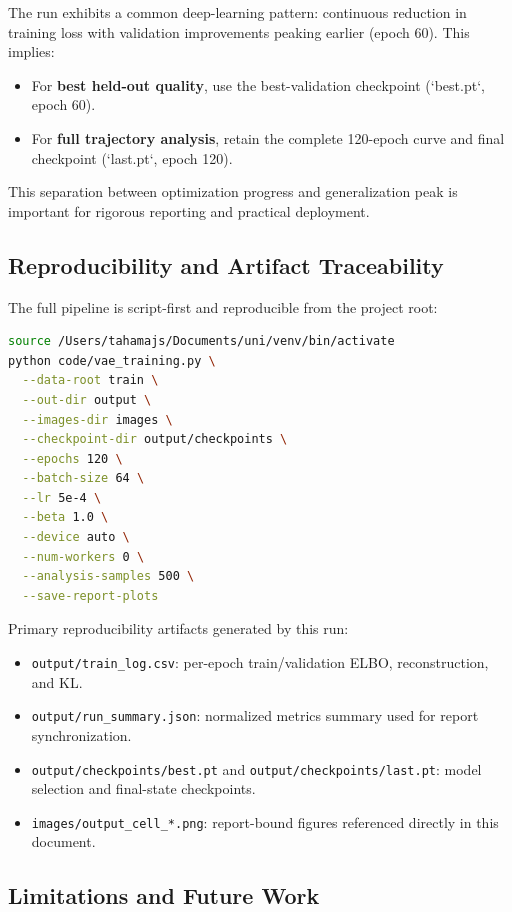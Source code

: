 \documentclass[conference]{IEEEtran}
\begin{document}
The run exhibits a common deep-learning pattern: continuous reduction in training loss with validation improvements peaking earlier (epoch 60). This implies:
\begin{itemize}
    \item For \textbf{best held-out quality}, use the best-validation checkpoint (`best.pt`, epoch 60).
    \item For \textbf{full trajectory analysis}, retain the complete 120-epoch curve and final checkpoint (`last.pt`, epoch 120).
\end{itemize}

This separation between optimization progress and generalization peak is important for rigorous reporting and practical deployment.

\subsection{Reproducibility and Artifact Traceability}

The full pipeline is script-first and reproducible from the project root:
\begin{lstlisting}[language=bash]
source /Users/tahamajs/Documents/uni/venv/bin/activate
python code/vae_training.py \
  --data-root train \
  --out-dir output \
  --images-dir images \
  --checkpoint-dir output/checkpoints \
  --epochs 120 \
  --batch-size 64 \
  --lr 5e-4 \
  --beta 1.0 \
  --device auto \
  --num-workers 0 \
  --analysis-samples 500 \
  --save-report-plots
\end{lstlisting}

Primary reproducibility artifacts generated by this run:
\begin{itemize}
    \item \texttt{output/train\_log.csv}: per-epoch train/validation ELBO, reconstruction, and KL.
    \item \texttt{output/run\_summary.json}: normalized metrics summary used for report synchronization.
    \item \texttt{output/checkpoints/best.pt} and \texttt{output/checkpoints/last.pt}: model selection and final-state checkpoints.
    \item \texttt{images/output\_cell\_*.png}: report-bound figures referenced directly in this document.
\end{itemize}

\subsection{Limitations and Future Work}
\end{document}
